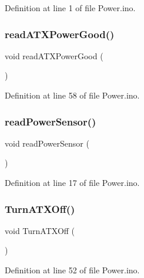 Definition at line 1 of file Power.\+ino.

\mbox{\label{_power_8ino_accba2cf07e246d7537b271091aa207a6}} 
\subsubsection{\texorpdfstring{readATXPowerGood()}{readATXPowerGood()}}
{\footnotesize\ttfamily void read\+A\+T\+X\+Power\+Good (\begin{DoxyParamCaption}{ }\end{DoxyParamCaption})}



Definition at line 58 of file Power.\+ino.

\mbox{\label{_power_8ino_a37c3304dd7012a9e15a3a82194493459}} 
\subsubsection{\texorpdfstring{readPowerSensor()}{readPowerSensor()}}
{\footnotesize\ttfamily void read\+Power\+Sensor (\begin{DoxyParamCaption}{ }\end{DoxyParamCaption})}



Definition at line 17 of file Power.\+ino.

\mbox{\label{_power_8ino_a8fb9dfef337ef5d83a61495d851c84d8}} 
\subsubsection{\texorpdfstring{TurnATXOff()}{TurnATXOff()}}
{\footnotesize\ttfamily void Turn\+A\+T\+X\+Off (\begin{DoxyParamCaption}{ }\end{DoxyParamCaption})}



Definition at line 52 of file Power.\+ino.

\mbox{\label{_power_8ino_a5c5e1cbad55f5a7e06793160b8aacc57}} 

